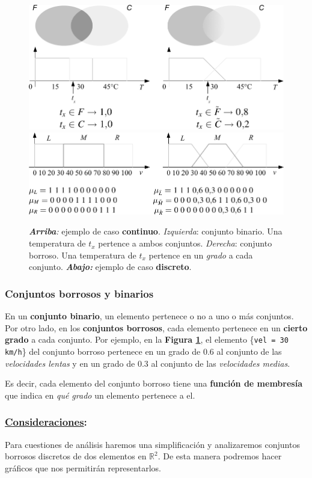 \documentclass[10pt,a4paper]{article}
\begin{document}
\begin{figure}
  \caption{\textit{\textbf{Arriba}:} ejemplo de caso \textbf{continuo}. \textit{Izquierda}: conjunto binario. Una temperatura de $t_x$ pertence a ambos conjuntos. \textit{Derecha}: conjunto borroso. Una temperatura de $t_x$ pertence en un \textit{grado} a cada conjunto. \textbf{\textit{Abajo:}} ejemplo de caso \textbf{discreto}.}
  \label{fig:fuzzy}
  \centering
  \hbox{\includegraphics[width=0.5\textwidth-\fboxrule-\fboxrule]{imgs/fuzzy.png}}
  \vspace{3em}
  \centering
  \hbox{\includegraphics[width=0.5\textwidth-\fboxrule-\fboxrule]{imgs/fuzzy_discrete.png}}
\end{figure}

\subsubsection{Conjuntos borrosos y binarios}

En un \textbf{conjunto binario}, un elemento pertenece o no a uno o más conjuntos. Por otro lado, en los \textbf{conjuntos borrosos}, cada elemento pertenece en un \textbf{cierto grado} a cada conjunto. Por ejemplo, en la \textbf{Figura \ref{fig:fuzzy}}, el elemento \{\texttt{vel = 30 km/h}\} del conjunto borroso pertenece en un grado de 0.6 al conjunto de las \textit{velocidades lentas} y en un grado de 0.3 al conjunto de las \textit{velocidades medias}. 

Es decir, cada elemento del conjunto borroso tiene una \textbf{función de membresía}  que indica en \textit{qué grado} un elemento pertenece a el.

\subsubsection*{\underline{Consideraciones}:}

Para cuestiones de análisis haremos una simplificación y analizaremos conjuntos borrosos discretos de dos elementos en $\mathbb{R}^2$. De esta manera podremos hacer gráficos que nos permitirán representarlos. 
\end{document}
